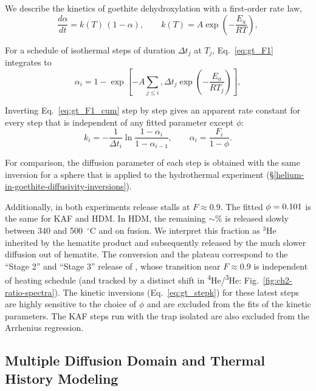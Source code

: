 We describe the kinetics of goethite dehydroxylation with a first-order rate law,
\begin{equation}
  \frac{d\alpha}{dt} = k(T)\,(1-\alpha),
  \qquad
  k(T) = A\exp\!\left(-\frac{E_a}{RT}\right),
  \label{eq:gt_F1}
\end{equation}

For a schedule of isothermal steps of duration $\Delta t_j$ at $T_j$, Eq.~\eqref{eq:gt_F1}
integrates to
\begin{equation}
  \alpha_i = 1 - \exp\!\left[-A\sum_{j\le i},\Delta t_j \exp\!\left(-\frac{E_a}{RT_j}\right)\right],
  \label{eq:gt_F1_cum}
\end{equation}

Inverting Eq.~\eqref{eq:gt_F1_cum} step by step gives an apparent rate constant for every
step that is independent of any fitted parameter except $\phi$:
\begin{equation}
  k_i = -\frac{1}{\Delta t_i}\ln\frac{1-\alpha_i}{1-\alpha_{i-1}},
  \qquad \alpha_i = \frac{F_i}{1-\phi}.
  \label{eq:gt_stepk}
\end{equation}

For comparison, the diffusion parameter of each step is obtained with the same
\citet{fechtigkalbitzer1966} inversion for a sphere that is applied to the hydrothermal
experiment (\S\ref{helium-in-goethite-diffusivity-inversions}).

Additionally, in both experiments release stalls at $F\approx0.9$. The fitted $\phi=0.101$ is the same for KAF
and HDM. In HDM, the remaining $\sim$\ChTwoKinPhiPct\% is released slowly between 340 and 500~$^\circ$C and on
fusion. We interpret this fraction as $^3$He inherited by the hematite product and subsequently
released by the much slower diffusion out of hematite. The conversion and the plateau correspond to the ``Stage 2'' and
``Stage 3'' release of \citet{farley2024}, whose transition near $F\approx0.9$ is independent of
heating schedule (and tracked by a distinct shift in \textsuperscript{4}He/\textsuperscript{3}He: Fig.~\ref{fig:ch2-ratio-spectra}).
The kinetic inversions (Eq.~\eqref{eq:gt_stepk}) for these latest steps are highly sensitive to the choice of $\phi$ and are excluded from the fits of the kinetic parameters.
The KAF steps run with the trap isolated are also excluded from the Arrhenius regression.

\subsection{Multiple Diffusion Domain and Thermal History Modeling}\label{sec:gt_mdd_methods}

